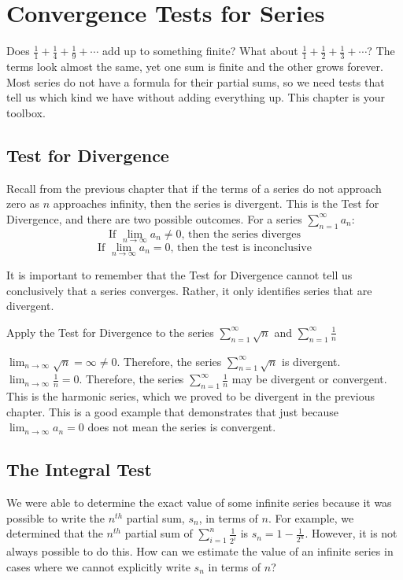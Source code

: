 \chapter{Convergence Tests for Series}

Does $\frac{1}{1} + \frac{1}{4} + \frac{1}{9} + \cdots$ add up to something
finite? What about $\frac{1}{1} + \frac{1}{2} + \frac{1}{3} + \cdots$? The
terms look almost the same, yet one sum is finite and the other grows forever.
Most series do not have a formula for their partial sums, so we need tests that
tell us which kind we have without adding everything up. This chapter is your
toolbox.

\section{Test for Divergence}
Recall from the previous chapter that if the terms of a series do not approach 
zero as $n$ approaches infinity, then the series is divergent. This is the 
Test for Divergence, and there are two possible 
outcomes. For a series $\sum_{n = 1}^\infty a_n$:
$$\text{If } \lim_{n \to \infty} a_n \neq 0 \text{, then the series diverges}$$
$$\text{If } \lim_{n \to \infty} a_n = 0 \text{, then the test is inconclusive}$$

It is important to remember that the Test for Divergence cannot tell us 
conclusively that a series converges. Rather, it only identifies series that 
are divergent. 

\begin{Worked}
\begin{Problem}
Apply the Test for Divergence to the series $\sum_{n=1}^
\infty \sqrt{n}$ and $\sum_{n=1}^\infty \frac{1}{n}$
\end{Problem}
\begin{Solution}
$\lim_{n \to \infty} \sqrt{n} = \infty \neq 0$. Therefore,
the series $\sum_{n=1}^\infty \sqrt{n}$ is divergent.
$\lim_{n \to \infty} \frac{1}{n} = 0$. Therefore, the series $\sum_{n=1}^
\infty \frac{1}{n}$ may be divergent or convergent. This is the harmonic 
series, which we proved to be divergent in the previous chapter. This is a 
good example that demonstrates that just because $\lim_{n \to \infty} a_n = 
0$ does not mean the series is convergent. 
\end{Solution}
\end{Worked}

\section{The Integral Test}
We were able to determine the exact value of some infinite series because it 
was possible to write the $n^{th}$ partial sum, $s_n$, in terms of $n$. For 
example, we determined that the $n^{th}$ partial sum of $\sum_{i = 1}^n 
\frac{1}{2^i}$ is $s_n = 1 - \frac{1}{2^n}$. However, it is not always possible 
to do this. How can we estimate the value of an infinite series in cases where 
we cannot explicitly write $s_n$ in terms of $n$? 

